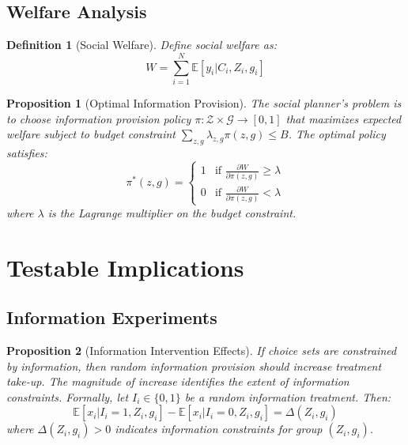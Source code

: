 \documentclass{article}
\newtheorem{proposition}{Proposition}
\newtheorem{definition}{Definition}
\newcommand{\E}{\mathbb{E}}
\newcommand{\G}{\mathcal{G}}
\begin{document}
\subsection{Welfare Analysis}

\begin{definition}[Social Welfare]
Define social welfare as:
\begin{equation}
W = \sum_{i=1}^N \E[y_i | C_i, Z_i, g_i] %
\end{equation}
\end{definition}

\begin{proposition}[Optimal Information Provision]
The social planner's problem is to choose information provision policy $\pi: \mathcal{Z} \times \G \to [0,1]$ that maximizes expected welfare subject to budget constraint $\sum_{z,g} \lambda_{z,g} \pi(z,g) \leq B$. %
The optimal policy satisfies:
\begin{equation}
\pi^*(z,g) = \begin{cases}
1 & \text{if } \frac{\partial W}{\partial \pi(z,g)} \geq \lambda \\
0 & \text{if } \frac{\partial W}{\partial \pi(z,g)} < \lambda
\end{cases}
\end{equation}
where $\lambda$ is the Lagrange multiplier on the budget constraint. %
\end{proposition}

\section{Testable Implications}

\subsection{Information Experiments}

\begin{proposition}[Information Intervention Effects]
If choice sets are constrained by information, then random information provision should increase treatment take-up. The magnitude of increase identifies the extent of information constraints.
Formally, let $I_i \in \{0,1\}$ be a random information treatment. Then:
\begin{equation}
\E[x_i | I_i = 1, Z_i, g_i] - \E[x_i | I_i = 0, Z_i, g_i] = \Delta(Z_i, g_i)
\end{equation}
where $\Delta(Z_i, g_i) > 0$ indicates information constraints for group $(Z_i, g_i)$. %
\end{proposition}
\end{document}
